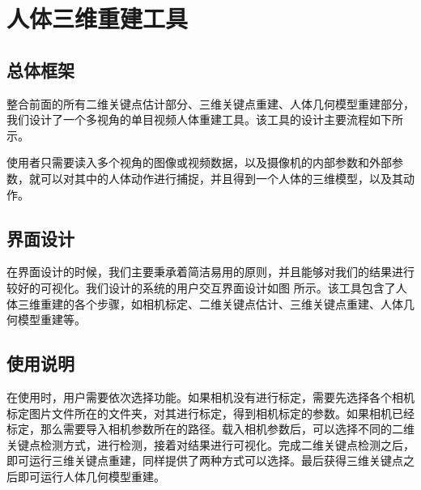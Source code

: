 \section{人体三维重建工具}

\subsection{总体框架}
整合前面的所有二维关键点估计部分、三维关键点重建、人体几何模型重建部分，我们设计了一个多视角的单目视频人体重建工具。该工具的设计主要流程如下所示。

使用者只需要读入多个视角的图像或视频数据，以及摄像机的内部参数和外部参数，就可以对其中的人体动作进行捕捉，并且得到一个人体的三维模型，以及其动作。

\subsection{界面设计}
在界面设计的时候，我们主要秉承着简洁易用的原则，并且能够对我们的结果进行较好的可视化。我们设计的系统的用户交互界面设计如图 所示。该工具包含了人体三维重建的各个步骤，如相机标定、二维关键点估计、三维关键点重建、人体几何模型重建等。

\subsection{使用说明}
在使用时，用户需要依次选择功能。如果相机没有进行标定，需要先选择各个相机标定图片文件所在的文件夹，对其进行标定，得到相机标定的参数。如果相机已经标定，那么需要导入相机参数所在的路径。载入相机参数后，可以选择不同的二维关键点检测方式，进行检测，接着对结果进行可视化。完成二维关键点检测之后，即可运行三维关键点重建，同样提供了两种方式可以选择。最后获得三维关键点之后即可运行人体几何模型重建。

